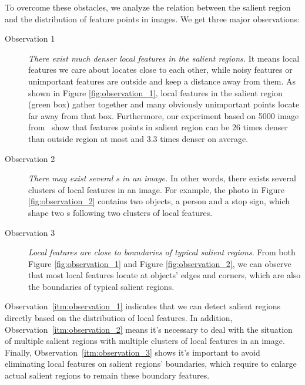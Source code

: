 To overcome these obstacles, we analyze the relation between the salient region and the distribution of feature points in images. We get three major observations:

\begin{description}
	
\item[Observation 1]  \textit{There exist much denser local features in the salient regions.} It means local features we care about locates close to each other, while noisy features or unimportant features are outside and keep a distance away from them. As shown in Figure \ref{fig:observation_1}, local features in the salient region (green box) gather together and many obviously unimportant points locate far away from that box. Furthermore, our experiment based on 5000 image from~\cite{liu2011learning} show that features points in salient region can be 26 times denser than outside region at most and 3.3 times denser on average.

\item[Observation 2]  \textit{There may exist several {\sregion}s in an image.} In other words, there exists several clusters of local features in an image. For example, the photo in Figure \ref{fig:observation_2} contains two objects, a person and a stop sign, which shape two {\sregion}s following two clusters of local features.

\item[Observation 3]  \textit{Local features are close to boundaries of typical salient regions.} From both Figure \ref{fig:observation_1} and Figure \ref{fig:observation_2}, we can observe that most local features locate at objects' edges and corners, which are also the boundaries of typical salient regions.

\end{description}

Observation~\ref{itm:observation_1} indicates that we can detect salient regions directly based on the distribution of local features. In addition, Observation~\ref{itm:observation_2} means it's necessary to deal with the situation of multiple salient regions with multiple clusters of local features in an image. Finally, Observation~\ref{itm:observation_3} shows it's important to avoid eliminating local features on salient regions' boundaries, which require to enlarge actual salient regions to remain these boundary features.
